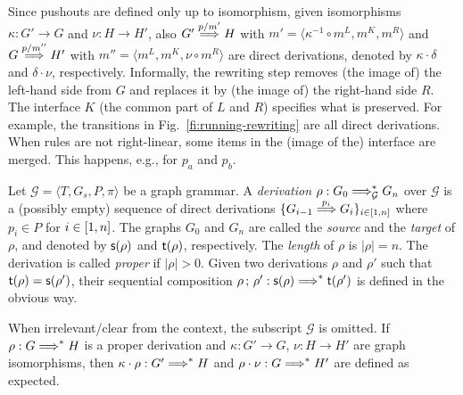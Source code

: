 % 
Since pushouts are defined only up to isomorphism, given isomorphisms
$\kappa : G' \to G$ and $\nu : H \to H'$, also $G' \stackrel{{p/m'}}{\Longrightarrow} H$
with $m' = \langle \kappa^{-1} \circ m^L, m^K, m^R \rangle$ and
$G \stackrel{{p/m''}}{\Longrightarrow} H'$ with $m'' = \langle  m^L, m^K, \nu \circ m^R \rangle$  are direct derivations, 
denoted by $\kappa \cdot \delta$ and $\delta \cdot \nu$, respectively.
%
Informally, the rewriting step removes (the image
of) the left-hand side from $G$ and replaces it by (the
image of) the right-hand side $R$. The interface $K$ (the common part 
of $L$ and $R$) specifies what is preserved.
%
For example, the transitions in Fig.~\ref{fi:running-rewriting} are
all direct derivations.
%
When rules are not right-linear, some items in the (image of the) interface are merged. This happens, e.g., for  $p_a$ and $p_b$.


\begin{definition}[derivations]
  \label{de:derivations}
  Let $\mathcal{G} = \langle T, G_s, P, \pi \rangle$ be a graph
  grammar. A \emph{derivation}
  $\rho: G_0 \stackrel{{}}{\Longrightarrow}^{*}_{\mathcal{G}} G_n$ over ${\mathcal{G}}$ is a
  (possibly empty) sequence of direct derivations
  $\{G_{i-1} \stackrel{{p_{i}}}{\Longrightarrow} G_i\}_{i \in [{1},{n}]}$ where
  $p_i \in P$ for $i \in [{1},{n}]$.  The graphs $G_0$ and $G_n$
  are called the \emph{source} and the \emph{target} of $\rho$, and
  denoted by $\mathsf{s}({\rho})$ and $\mathsf{t}({\rho})$, respectively. The
  \emph{length} of $\rho$ is $|\rho| = n$.
  The derivation is called {\em
    proper} if $|\rho| > 0$.
  Given two derivations $\rho$
  and $\rho'$ such that $\mathsf{t}({\rho}) = \mathsf{s}({\rho'})$, their
  sequential composition
  $\rho\,;\,\rho': \mathsf{s}({\rho}) \stackrel{{}}{\Longrightarrow}^{*} \mathsf{t}({\rho'})$ is
  defined in the obvious way.
\end{definition}

When irrelevant/clear from the context, the subscript
$\mathcal{G}$ is omitted.  
If
$\rho : G \stackrel{{}}{\Longrightarrow}^{*} H$ is a proper derivation 
and
$\kappa : G' \to G$, $\nu : H \to H'$ are graph isomorphisms, then
$\kappa \cdot \rho : G' \stackrel{{}}{\Longrightarrow}^{*} H$ and
$\rho \cdot \nu : G \stackrel{{}}{\Longrightarrow}^{*} H'$ are defined as expected.

